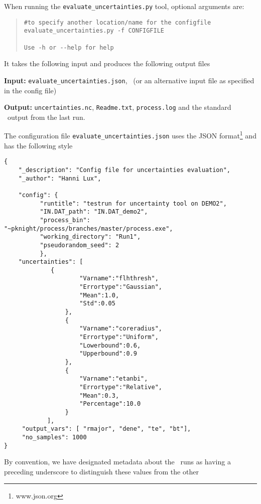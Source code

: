 When running the \texttt{evaluate\_uncertainties.py} tool, optional arguments are:
\begin{quote}
\begin{verbatim}
#to specify another location/name for the configfile
evaluate_uncertainties.py -f CONFIGFILE

Use -h or --help for help
\end{verbatim}
\end{quote}
It takes the following input and produces the following output files
\begin{description}
\item{\textbf{Input:}} \texttt{evaluate\_uncertainties.json}, \indat\ (or an
  alternative input file as specified in the config file)
                                
\item{\textbf{Output:}} \texttt{uncertainties.nc}, \texttt{Readme.txt},
  \texttt{process.log} and the standard \process\ output from the last run.
\end{description}
The configuration file \texttt{evaluate\_uncertainties.json} uses the JSON
format\footnote{www.json.org} and has the following style
\begin{framed}
\begin{verbatim}
{
	"_description": "Config file for uncertainties evaluation",
	"_author": "Hanni Lux",
	
	"config": {
		  "runtitle": "testrun for uncertainty tool on DEMO2",
		  "IN.DAT_path": "IN.DAT_demo2",
		  "process_bin": "~pknight/process/branches/master/process.exe",
		  "working_directory": "Run1",
		  "pseudorandom_seed": 2
		  },
	"uncertainties": [
		     {
               	     "Varname":"flhthresh",
               	     "Errortype":"Gaussian",
               	     "Mean":1.0,
               	     "Std":0.05
          	     },          
          	     {
               	     "Varname":"coreradius",
               	     "Errortype":"Uniform",
               	     "Lowerbound":0.6,
               	     "Upperbound":0.9
          	     },
          	     {
               	     "Varname":"etanbi",
               	     "Errortype":"Relative",
               	     "Mean":0.3,
               	     "Percentage":10.0
          	     } 
	     	],
     "output_vars": [ "rmajor", "dene", "te", "bt"],
     "no_samples": 1000    
}
\end{verbatim}
\end{framed}
By convention, we have designated metadata about the \process\ runs as having
a preceding underscore to distinguish these values from the other
